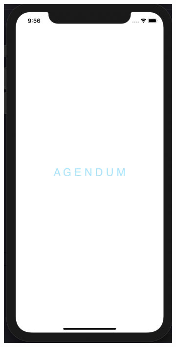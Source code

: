 \begin{figure}[H]
    \centering
    \begin{subfigure}[b]{0.3\textwidth}
        \centering
        \includegraphics[width=\textwidth]{./graphics/Implementation/Splash_Sign_Up_Sign_In/splash.png}

\end{subfigure}
\end{figure}
